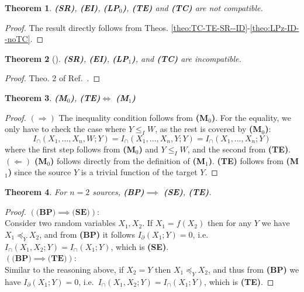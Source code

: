 \documentclass{article}
\newcommand{\ts}[1]{\ensuremath{_{\text{#1}}}}
\newcommand{\Icap}{\ensuremath{I_\cap(X_1,X_2;Y)}}
\newcommand{\SR}{\textbf{(SR)}\xspace} %
\newcommand{\Mz}{\textbf{(M\ts{0})}\xspace} %
\newcommand{\LPz}{\textbf{(LP\ts{0})}\xspace} %
\newcommand{\TC}{\textbf{(TC)}\xspace} %
\newcommand{\Mo}{\textbf{(M\ts{1})}\xspace} %
\newcommand{\LPo}{\textbf{(LP\ts{1})}\xspace} %
\newcommand{\BP}{\textbf{(BP)}\xspace} %
\newcommand{\TE}{\textbf{(TE)}\xspace} %
\newcommand{\EI}{\textbf{(EI)}\xspace} %
\newcommand{\SE}{\textbf{(SE)}\xspace} %
\newtheorem{theorem}{Theorem}
\begin{document}
\begin{theorem} \label{theo:noSR-EI-LPo-TE-TC}
    \SR, \EI, \LPz, \TE and \TC are not compatible.
\end{theorem}
\begin{proof}
    The result directly follows from Theos. \ref{theo:TC-TE-SR--ID}-\ref{theo:LPz-ID--noTC}.
\end{proof}

\begin{theorem}[\!\!\cite{matthias2025novel}]\label{theo:noTC-LP1}
    \SR, \EI, \LPo, and \TC are incompatible. 
\end{theorem}
\begin{proof}
    Theo. 2 of Ref.~\cite{matthias2025novel}.
\end{proof}

\begin{theorem} \label{theo:M0-TE--M1}
    \Mz, \TE $\iff$ \Mo 
\end{theorem}
\begin{proof}
    $(\Rightarrow)$ The inequality condition follows from \Mz. For the equality, we only have to check the case where $Y\leq_I W$, as the rest is covered by \Mz: 
    \begin{equation}
        I_\cap(X_1,\ldots,X_n,W;Y) = I_\cap(X_1,\ldots,X_n,Y;Y) = I_\cap(X_1,\ldots,X_n;Y)
    \end{equation}
    where the first step follows from \Mz and $Y\leq_I W$, and the second from \TE. \\
    $(\Leftarrow)$ \Mz follows directly from the definition of \Mo. \TE follows from \Mo since the source $Y$ is a trivial function of the target $Y$.
\end{proof}

\begin{theorem} \label{theo:BP--TE-SE}
    For $n=2$ sources, \BP $\implies$ \SE, \TE.
\end{theorem}
\begin{proof}
    $(\BP \implies \SE)$: \\
    Consider two random variables $X_1,X_2$. If $X_1=f(X_2)$ then for any $Y$ we have $X_1\preceq_Y X_2$, and from \BP it follows $I_\partial(X_1;Y)=0$, i.e.\ $\Icap = I_\cap(X_1;Y)$, which is \SE. 
    \\ $(\BP \implies \TE)$: \\
    Similar to the reasoning above, if $X_2=Y$ then $X_1\preceq_Y X_2$, and thus from \BP we have $I_\partial(X_1;Y)=0$, i.e.\ $\Icap = I_\cap(X_1;Y)$, which is \TE. 
\end{proof}
\end{document}
